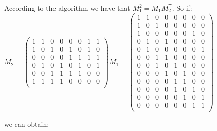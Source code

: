 According to the algorithm we have that $M_{1}^{2} = M_{1}M_{2}^{\mathsf{T}}$. So if:\\

$M_2 =
\begin{pmatrix}
1 & 1 & 0 & 0 & 0 & 0 & 1 & 1\\
1 & 0 & 1 & 0 & 1 & 0 & 1 & 0\\
0 & 0 & 0 & 0 & 1 & 1 & 1 & 1\\
0 & 1 & 0 & 1 & 0 & 1 & 0 & 1\\
0 & 0 & 1 & 1 & 1 & 1 & 0 & 0\\
1 & 1 & 1 & 1 & 0 & 0 & 0 & 0\\
\end{pmatrix}
M_1 =
\begin{pmatrix}
1 & 1 & 0 & 0 & 0 & 0 & 0 & 0\\
1 & 0 & 1 & 0 & 0 & 0 & 0 & 0\\
1 & 0 & 0 & 0 & 0 & 0 & 1 & 0\\
0 & 1 & 0 & 1 & 0 & 0 & 0 & 0\\
0 & 1 & 0 & 0 & 0 & 0 & 0 & 1\\
0 & 0 & 1 & 1 & 0 & 0 & 0 & 0\\
0 & 0 & 1 & 0 & 1 & 0 & 0 & 0\\
0 & 0 & 0 & 1 & 0 & 1 & 0 & 0\\
0 & 0 & 0 & 0 & 1 & 1 & 0 & 0\\
0 & 0 & 0 & 0 & 1 & 0 & 1 & 0\\
0 & 0 & 0 & 0 & 0 & 1 & 0 & 1\\
0 & 0 & 0 & 0 & 0 & 0 & 1 & 1\\
\end{pmatrix}$

we can obtain:\\

